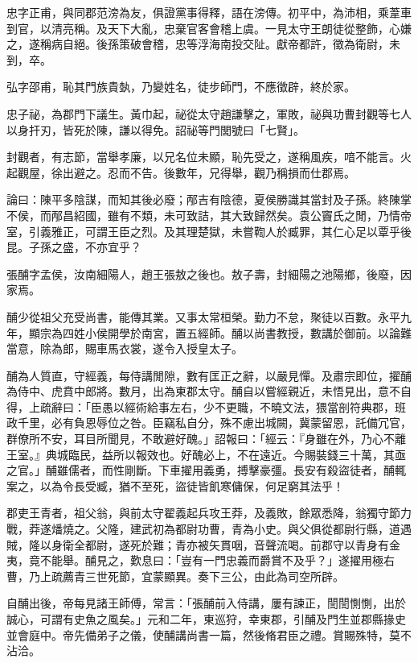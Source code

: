 \begin{pinyinscope}
忠字正甫，與同郡范滂為友，俱證黨事得釋，語在滂傳。初平中，為沛相，乘葦車到官，以清亮稱。及天下大亂，忠棄官客會稽上虞。一見太守王朗徒從整飾，心嫌之，遂稱病自絕。後孫策破會稽，忠等浮海南投交阯。獻帝都許，徵為衛尉，未到，卒。

弘字邵甫，恥其門族貴埶，乃變姓名，徒步師門，不應徵辟，終於家。

忠子祕，為郡門下議生。黃巾起，祕從太守趙謙擊之，軍敗，祕與功曹封觀等七人以身扞刃，皆死於陳，謙以得免。詔祕等門閭號曰「七賢」。

封觀者，有志節，當舉孝廉，以兄名位未顯，恥先受之，遂稱風疾，喑不能言。火起觀屋，徐出避之。忍而不告。後數年，兄得舉，觀乃稱損而仕郡焉。

論曰：陳平多陰謀，而知其後必廢；邴吉有陰德，夏侯勝識其當封及子孫。終陳掌不侯，而邴昌紹國，雖有不類，未可致詰，其大致歸然矣。袁公竇氏之閒，乃情帝室，引義雅正，可謂王臣之烈。及其理楚獄，未嘗鞫人於臧罪，其仁心足以覃乎後昆。子孫之盛，不亦宜乎？

張酺字孟侯，汝南細陽人，趙王張敖之後也。敖子壽，封細陽之池陽鄉，後廢，因家焉。

酺少從祖父充受尚書，能傳其業。又事太常桓榮。勤力不怠，聚徒以百數。永平九年，顯宗為四姓小侯開學於南宮，置五經師。酺以尚書教授，數講於御前。以論難當意，除為郎，賜車馬衣裳，遂令入授皇太子。

酺為人質直，守經義，每侍講閒隙，數有匡正之辭，以嚴見憚。及肅宗即位，擢酺為侍中、虎賁中郎將。數月，出為東郡太守。酺自以嘗經親近，未悟見出，意不自得，上疏辭曰：「臣愚以經術給事左右，少不更職，不曉文法，猥當剖符典郡，班政千里，必有負恩辱位之咎。臣竊私自分，殊不慮出城闕，冀蒙留恩，託備冗官，群僚所不安，耳目所聞見，不敢避好醜。」詔報曰：「經云：『身雖在外，乃心不離王室。』典城臨民，益所以報效也。好醜必上，不在遠近。今賜裝錢三十萬，其亟之官。」酺雖儒者，而性剛斷。下車擢用義勇，搏擊豪彊。長安有殺盜徒者，酺輒案之，以為令長受臧，猶不至死，盜徒皆飢寒傭保，何足窮其法乎！

郡吏王青者，祖父翁，與前太守翟義起兵攻王莽，及義敗，餘眾悉降，翁獨守節力戰，莽遂燔燒之。父隆，建武初為都尉功曹，青為小史。與父俱從都尉行縣，道遇賊，隆以身衛全都尉，遂死於難；青亦被矢貫咽，音聲流喝。前郡守以青身有金夷，竟不能舉。酺見之，歎息曰：「豈有一門忠義而爵賞不及乎？」遂擢用極右曹，乃上疏薦青三世死節，宜蒙顯異。奏下三公，由此為司空所辟。

自酺出後，帝每見諸王師傅，常言：「張酺前入侍講，屢有諫正，誾誾惻惻，出於誠心，可謂有史魚之風矣。」元和二年，東巡狩，幸東郡，引酺及門生並郡縣掾史並會庭中。帝先備弟子之儀，使酺講尚書一篇，然後脩君臣之禮。賞賜殊特，莫不沾洽。


\end{pinyinscope}
